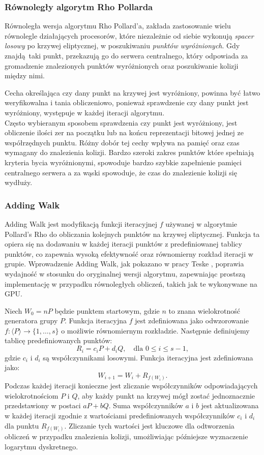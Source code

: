 \subsubsection{Równoległy algorytm Rho Pollarda}
Równoległa wersja algorytmu Rho Pollard'a, zakłada zastosowanie wielu równolegle działających
procesorów, które niezależnie od siebie wykonują \textit{spacer losowy} po krzywej eliptycznej,
w poszukiwaniu \textit{punktów wyróżnionych}. Gdy znajdą taki punkt, przekazują go do serwera centralnego,
który odpowiada za gromadzenie znalezionych punktów wyróżnionych oraz poszukiwanie kolizji między nimi.
\par
Cecha określająca czy dany punkt na krzywej jest wyróżniony, powinna być łatwo weryfikowalna i tania obliczeniowo,
ponieważ sprawdzenie czy dany punkt jest wyróżniony, występuje w każdej iteracji algorytmu. \\
Często wybieranym sposobem sprawdzenia czy punkt jest wyróżniony, jest obliczenie ilości zer na początku lub na końcu
reprezentacji bitowej jednej ze współrzędnych punktu. Różny dobór tej cechy wpływa na pamięć oraz
czas wymagany do znalezienia kolizji. Bardzo szeroki zakres punktów które spełniają kryteria bycia wyróżnionymi,
spowoduje bardzo szybkie zapełnienie pamięci centralnego serwera a za wąski spowoduje, że czas do znalezienie kolizji się wydłuży.

\subsubsection{Adding Walk}

Adding Walk jest modyfikacją funkcji iteracyjnej $f$ używanej w algorytmie Pollard’s 
Rho do obliczania kolejnych punktów na krzywej eliptycznej. Funkcja ta opiera się 
na dodawaniu w każdej iteracji punktów z predefiniowanej tablicy punktów, co 
zapewnia wysoką efektywność oraz równomierny rozkład iteracji w grupie. Wprowadzenie 
Adding Walk, jak pokazano w pracy Teske \cite{Teske2000}, poprawia wydajność w 
stosunku do oryginalnej wersji algorytmu, zapewniając prostszą implementację w 
przypadku równoległych obliczeń, takich jak te wykonywane na GPU.

Niech $W_0 = nP$ będzie punktem startowym, gdzie $n$ to znana wielokrotność 
generatora grupy $P$. Funkcja iteracyjna $f$ jest zdefiniowana jako odwzorowanie 
$f: \langle P \rangle \rightarrow \{1, \ldots, s\}$ o możliwie równomiernym 
rozkładzie. Następnie definiujemy tablicę predefiniowanych punktów:
$$
R_i = c_i P + d_i Q, \quad \text{dla } 0 \leq i \leq s - 1,
$$
gdzie $c_i$ i $d_i$ są współczynnikami losowymi. Funkcja iteracyjna jest zdefiniowana 
jako:
$$
W_{i+1} = W_i + R_{f(W_i)}.
$$
Podczas każdej iteracji konieczne jest zliczanie współczynników odpowiadających 
wielokrotnościom $P$ i $Q$, aby każdy punkt na krzywej mógł zostać jednoznacznie 
przedstawiony w postaci $aP + bQ$. Suma współczynników $a$ i $b$ jest aktualizowana 
w każdej iteracji zgodnie z wartościami predefiniowanych współczynników 
$c_i$ i $d_i$ dla punktu $R_{f(W_i)}$. Zliczanie tych wartości jest kluczowe 
dla odtworzenia obliczeń w przypadku znalezienia kolizji, umożliwiając późniejsze 
wyznaczenie logarytmu dyskretnego.

